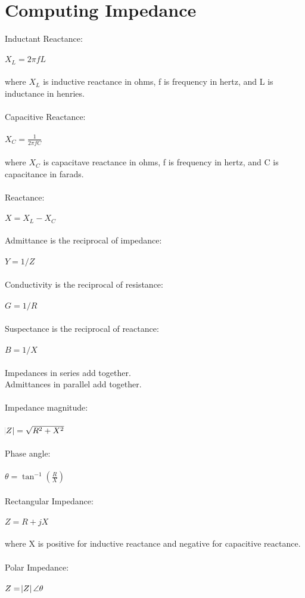 \documentclass[10pt]{article}
\begin{document}
\section*{Computing Impedance}
Inductant Reactance:\\\\
$X_L = 2\pi fL$\\\\
where $X_L$ is inductive reactance in ohms, f is frequency in hertz, and L is inductance in henries.\\\\
Capacitive Reactance:\\\\
$X_C = \frac{1}{2\pi fC}$\\\\
where $X_C$ is capacitave reactance in ohms, f is frequency in hertz, and C is capacitance in farads.\\\\
Reactance:\\\\
$X = X_L - X_C$\\\\
Admittance is the reciprocal of impedance:\\\\
$Y = 1/Z$\\\\
Conductivity is the reciprocal of resistance:\\\\
$G = 1/R$\\\\
Suspectance is the reciprocal of reactance:\\\\
$B = 1/X$\\\\
Impedances in series add together.\\
Admittances in parallel add together.\\\\
Impedance magnitude:\\\\
$\abs{Z}=\sqrt{R^2 + X^2}$\\\\
Phase angle:\\\\
$\theta = \tan^{-1}(\frac{R}{X})$\\\\
Rectangular Impedance:\\\\
$Z = R + jX$\\\\
where X is positive for inductive reactance and negative for capacitive reactance.\\\\
Polar Impedance:\\\\
$Z = \abs{Z}\angle\theta$
\end{document}

